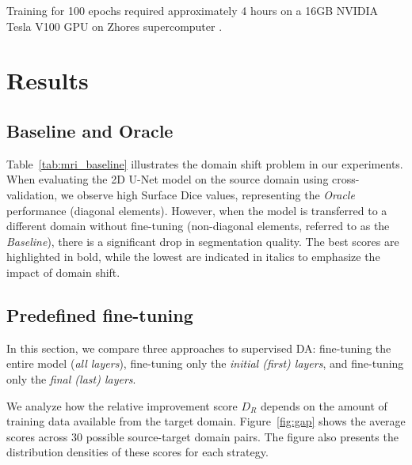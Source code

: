 Training for 100 epochs required approximately 4 hours on a 16GB NVIDIA Tesla V100 GPU on Zhores supercomputer \cite{zacharov2019zhores}.


\section{Results}


\subsection{Baseline and Oracle}

Table~\ref{tab:mri_baseline} illustrates the domain shift problem in our experiments. When evaluating the 2D U-Net model on the source domain using cross-validation, we observe high Surface Dice values, representing the \textit{Oracle} performance (diagonal elements). However, when the model is transferred to a different domain without fine-tuning (non-diagonal elements, referred to as the \textit{Baseline}), there is a significant drop in segmentation quality. The best scores are highlighted in bold, while the lowest are indicated in italics to emphasize the impact of domain shift.




\subsection{Predefined fine-tuning}

In this section, we compare three approaches to supervised DA: fine-tuning the entire model (\textit{all layers}), fine-tuning only the \textit{initial (first) layers}, and fine-tuning only the \textit{final (last) layers}.

We analyze how the relative improvement score $D_R$ depends on the amount of training data available from the target domain. Figure~\ref{fig:gap} shows the average scores across 30 possible source-target domain pairs. The figure also presents the distribution densities of these scores for each strategy.

